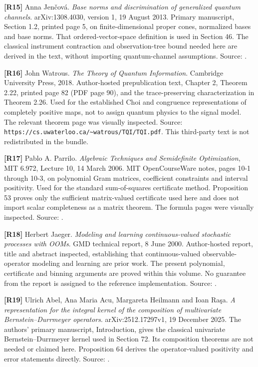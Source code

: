 \documentclass[11pt,oneside,openany]{book}
\numberwithin{equation}{section}
\begin{document}
\textbf{{[}R15{]}} Anna Jen\v{c}ová. \emph{Base norms and discrimination of
generalized quantum channels}. arXiv:1308.4030, version 1, 19 August
2013. Primary manuscript, Section 1.2, printed page 5, on
finite-dimensional proper cones, normalized bases and base norms. That
ordered-vector-space definition is used in Section 46. The classical
instrument contraction and observation-tree bound needed here are
derived in the text, without importing quantum-channel assumptions.
Source: .

\textbf{{[}R16{]}} John Watrous. \emph{The Theory of Quantum
Information}. Cambridge University Press, 2018. Author-hosted
prepublication text, Chapter 2, Theorem 2.22, printed page 82 (PDF page
90), and the trace-preserving characterization in Theorem 2.26. Used for
the established Choi and congruence representations of completely
positive maps, not to assign quantum physics to the signal model. The
relevant theorem page was visually inspected. Source:
\texttt{https://cs.uwaterloo.ca/\textasciitilde{}watrous/TQI/TQI.pdf}.
This third-party text is not redistributed in the bundle.

\textbf{{[}R17{]}} Pablo A. Parrilo. \emph{Algebraic Techniques and
Semidefinite Optimization}, MIT 6.972, Lecture 10, 14 March 2006. MIT
OpenCourseWare notes, pages 10-1 through 10-3, on polynomial Gram
matrices, coefficient constraints and interval positivity. Used for the
standard sum-of-squares certificate method. Proposition 53 proves only
the sufficient matrix-valued certificate used here and does not import
scalar completeness as a matrix theorem. The formula pages were visually
inspected. Source:
.

\textbf{{[}R18{]}} Herbert Jaeger. \emph{Modeling and learning
continuous-valued stochastic processes with OOMs}. GMD technical report,
8 June 2000. Author-hosted report, title and abstract inspected,
establishing that continuous-valued observable-operator modeling and
learning are prior work. The present polynomial, certificate and binning
arguments are proved within this volume. No guarantee from the report is
assigned to the reference implementation. Source:
.

\textbf{{[}R19{]}} Ulrich Abel, Ana Maria Acu, Margareta Heilmann and
Ioan Ra\c{s}a. \emph{A representation for the integral kernel of the
composition of multivariate Bernstein--Durrmeyer operators}.
arXiv:2512.17297v1, 19 December 2025. The authors' primary manuscript,
Introduction, gives the classical univariate Bernstein--Durrmeyer kernel
used in Section 72. Its composition theorems are not needed or claimed
here. Proposition 64 derives the operator-valued positivity and error
statements directly. Source:
.
\end{document}
